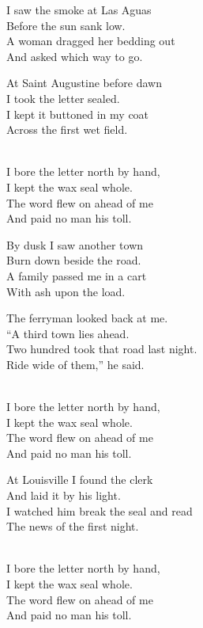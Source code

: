 \begin{lyrics}
I saw the smoke at Las Aguas\\
Before the sun sank low.\\
A woman dragged her bedding out\\
And asked which way to go.

At Saint Augustine before dawn\\
I took the letter sealed.\\
I kept it buttoned in my coat\\
Across the first wet field.

\\
I bore the letter north by hand,\\
I kept the wax seal whole.\\
The word flew on ahead of me\\
And paid no man his toll.


By dusk I saw another town\\
Burn down beside the road.\\
A family passed me in a cart\\
With ash upon the load.

The ferryman looked back at me.\\
“A third town lies ahead.\\
Two hundred took that road last night.\\
Ride wide of them,” he said.

\\
I bore the letter north by hand,\\
I kept the wax seal whole.\\
The word flew on ahead of me\\
And paid no man his toll.


At Louisville I found the clerk\\
And laid it by his light.\\
I watched him break the seal and read\\
The news of the first night.

\\
I bore the letter north by hand,\\
I kept the wax seal whole.\\
The word flew on ahead of me\\
And paid no man his toll.
\end{lyrics}


